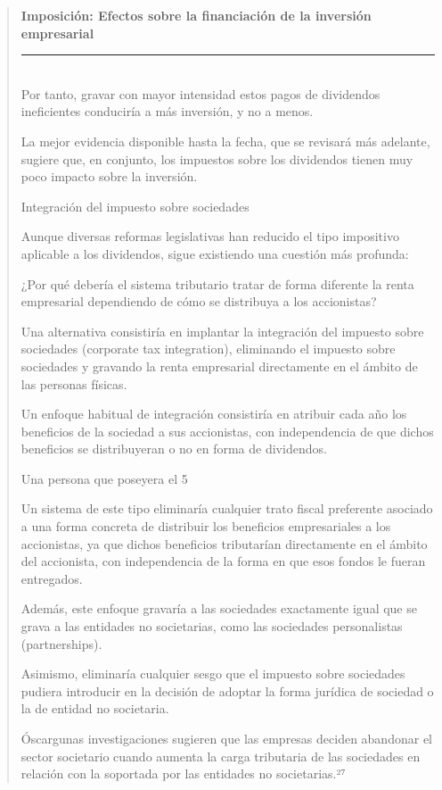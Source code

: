 \documentclass[10pt,a4paper]{article}
\newenvironment{specialblock}[1]{%
      \begin{quote} %
      \small %
      \noindent\textbf{#1}\\[-0.3em] %
      \rule{\linewidth}{0.4pt}\\[0.6em]}{
      \end{quote}}
\begin{document}
\begin{specialblock}{Imposición: Efectos sobre la financiación de la inversión empresarial}
    Por tanto, gravar con mayor intensidad estos pagos de dividendos ineficientes conduciría a más inversión, y no a menos.
    
    La mejor evidencia disponible hasta la fecha, que se revisará más adelante, sugiere que, en conjunto, los impuestos sobre los dividendos tienen muy poco impacto sobre la inversión.
    
    Integración del impuesto sobre sociedades
    
    Aunque diversas reformas legislativas han reducido el tipo impositivo aplicable a los dividendos, sigue existiendo una cuestión más profunda:
    
    ¿Por qué debería el sistema tributario tratar de forma diferente la renta empresarial dependiendo de cómo se distribuya a los accionistas?
    
    Una alternativa consistiría en implantar la integración del impuesto sobre sociedades (corporate tax integration), eliminando el impuesto sobre sociedades y gravando la renta empresarial directamente en el ámbito de las personas físicas.
    
    Un enfoque habitual de integración consistiría en atribuir cada año los beneficios de la sociedad a sus accionistas, con independencia de que dichos beneficios se distribuyeran o no en forma de dividendos.
    
    Una persona que poseyera el 5 %
    
    Un sistema de este tipo eliminaría cualquier trato fiscal preferente asociado a una forma concreta de distribuir los beneficios empresariales a los accionistas, ya que dichos beneficios tributarían directamente en el ámbito del accionista, con independencia de la forma en que esos fondos le fueran entregados.
    
    Además, este enfoque gravaría a las sociedades exactamente igual que se grava a las entidades no societarias, como las sociedades personalistas (partnerships).
    
    Asimismo, eliminaría cualquier sesgo que el impuesto sobre sociedades pudiera introducir en la decisión de adoptar la forma jurídica de sociedad o la de entidad no societaria.
    
    Óscargunas investigaciones sugieren que las empresas deciden abandonar el sector societario cuando aumenta la carga tributaria de las sociedades en relación con la soportada por las entidades no societarias.²⁷
    

\end{specialblock}
\end{document}
